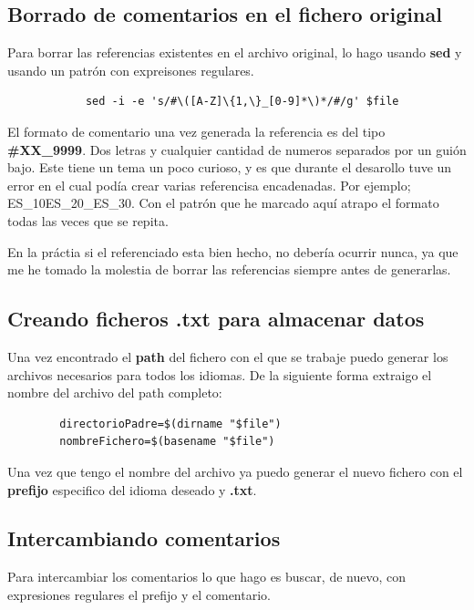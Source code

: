 \documentclass{article}
\begin{document}
    \subsection{Borrado de comentarios en el fichero original}
        Para borrar las referencias existentes en el archivo original, lo hago usando \textbf{sed} y usando un patrón con expreisones regulares.

        \begin{verbatim}
            sed -i -e 's/#\([A-Z]\{1,\}_[0-9]*\)*/#/g' $file
        \end{verbatim}

        El formato de comentario una vez generada la referencia es del tipo \textbf{\#XX\_9999}. Dos letras y cualquier cantidad de numeros separados por un guión bajo. Este tiene un tema un poco curioso, y es que durante el desarollo tuve un error en el cual podía crear varias referencisa encadenadas. Por ejemplo; ES\_10ES\_20\_ES\_30. Con el patrón que he marcado aquí atrapo el formato todas las veces que se repita.

        En la práctia si el referenciado esta bien hecho, no debería ocurrir nunca, ya que me he tomado la molestia de borrar las referencias siempre antes de generarlas.
    
    \subsection{Creando ficheros .txt para almacenar datos}
        Una vez encontrado el \textbf{path} del fichero con el que se trabaje puedo generar los archivos necesarios para todos los idiomas. De la siguiente forma extraigo el nombre del archivo del path completo:

        \begin{verbatim}
        directorioPadre=$(dirname "$file")
        nombreFichero=$(basename "$file")
        \end{verbatim}

        Una vez que tengo el nombre del archivo ya puedo generar el nuevo fichero con el \textbf{prefijo} especifico del idioma deseado y \textbf{.txt}.
        
    \subsection{Intercambiando comentarios}
        Para intercambiar los comentarios lo que hago es buscar, de nuevo, con expresiones regulares el prefijo y el comentario.
\end{document}
